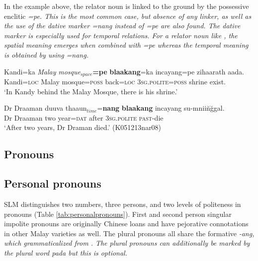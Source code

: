 In the example above, the relator noun is linked to the ground by the possessive enclitic \em =pe\em. This is the most common case, but absence of any linker, as well as the use of the dative marker \em =nang \em instead of \em =pe \em are also found. The dative marker is especially used for temporal relations. For a relator noun like , the spatial meaning emerges when combined with \em =pe \em whereas the temporal meaning is obtained by using \em =nang\em.

\ea \label{ex:form:reln:pe:space}
\gll Kandi=ka {\em Malay} {\em mosque}$_{space}$\textbf{=pe} \textbf{blaakang}=ka incayang=pe zihaarath aada. \\
     Kandi=\textsc{loc} Malay mosque=\textsc{poss} back=\textsc{loc} 3\textsc{sg}.\textsc{polite}=\textsc{poss} shrine exist. \\
    `In Kandy behind the Malay Mosque, there is his shrine.'
\z

\ea\label{ex:form:reln:blaakang:nang:time}
\gll Dr Draaman duuva thaaun$_{time}$=\textbf{nang} \textbf{blaakang} incayang su-mnii\u n\u ggal. \\
 Dr Draaman two year=\textsc{dat} after 3\textsc{sg}.\textsc{polite} \textsc{past}-die\\
`After two years, Dr Draman died.' (K051213nar08)
\z



\subsection{Pronouns}
\subsection{Personal pronouns}
SLM distinguishes two numbers, three persons, and two levels of politeness in pronouns (Table \ref{tab:personalpronouns}). First and second person singular impolite pronouns are originally Chinese loans and have pejorative connotations in other Malay varieties as well. The plural pronouns all share the formative \em -ang\em, which grammaticalized from . The plural pronouns can additionally be marked by the plural word \em pada \em but this is optional.


